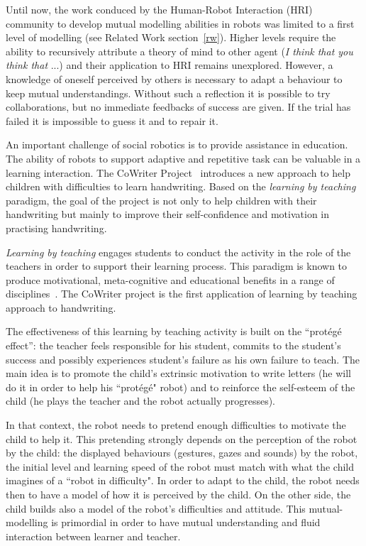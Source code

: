 \documentclass[conference]{IEEEtran}
\begin{document}
Until now, the work conduced by the Human-Robot Interaction (HRI) community to develop mutual modelling abilities in robots was limited to a first level of modelling (see Related Work section~\ref{rw}). Higher levels require the ability to recursively attribute a theory of mind to other agent (\textit{I think that you think that} ...) and their application to HRI remains unexplored. However, a knowledge of oneself perceived by others is necessary to adapt a behaviour to keep mutual understandings. Without such a reflection it is possible to try collaborations, but no immediate feedbacks of success are given. If the trial has failed it is impossible to guess it and to repair it. 


An important challenge of social robotics is to provide assistance in education. 
The ability of robots to support adaptive and repetitive task can be valuable in a learning interaction.
The CoWriter Project~\cite{Hood,jacq2016building} introduces a new approach to help children with difficulties to learn handwriting. 
Based on the \emph{learning by teaching} paradigm, the goal of the project is not only to help children with their handwriting but mainly to improve their self-confidence and motivation in practising handwriting.

\emph{Learning by teaching} engages students to conduct the activity in the role of the teachers in order to support their learning process. 
This  paradigm is known to produce motivational, meta-cognitive and educational benefits in a range of disciplines~\cite{Rohrbeck2003}. 
The CoWriter project is the first application of learning by teaching approach to handwriting.

The effectiveness of this learning by teaching activity is built on the ``prot\'eg\'e effect'': the teacher feels responsible for his student, commits
to the student's success and possibly experiences student's failure as his own
failure to teach. 
The main idea is to promote the child's extrinsic motivation to write letters (he will do it in order to help his ``prot\'eg\'e" robot) and to reinforce the self-esteem of the child (he plays the teacher and the robot actually progresses).

In that context, the robot needs to pretend enough difficulties to motivate the child to help it. 
This pretending strongly depends on the perception of the robot by the child: the displayed behaviours (gestures, gazes and sounds) by the robot, the initial level and learning speed of the robot must match with what the child imagines of a ``robot in difficulty".
In order to adapt to the child, the robot needs then to have a model of how it is perceived by the child. On the other side, the child builds also a model of the robot's difficulties and attitude. 
This mutual-modelling is primordial in order to have mutual understanding and fluid interaction between learner and teacher. 
\end{document}
